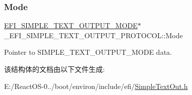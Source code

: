 \subsubsection{\texorpdfstring{Mode}{Mode}}
{\footnotesize\ttfamily \hyperlink{struct_e_f_i___s_i_m_p_l_e___t_e_x_t___o_u_t_p_u_t___m_o_d_e}{E\+F\+I\+\_\+\+S\+I\+M\+P\+L\+E\+\_\+\+T\+E\+X\+T\+\_\+\+O\+U\+T\+P\+U\+T\+\_\+\+M\+O\+DE}$\ast$ \+\_\+\+E\+F\+I\+\_\+\+S\+I\+M\+P\+L\+E\+\_\+\+T\+E\+X\+T\+\_\+\+O\+U\+T\+P\+U\+T\+\_\+\+P\+R\+O\+T\+O\+C\+O\+L\+::\+Mode}

Pointer to S\+I\+M\+P\+L\+E\+\_\+\+T\+E\+X\+T\+\_\+\+O\+U\+T\+P\+U\+T\+\_\+\+M\+O\+DE data. 

该结构体的文档由以下文件生成\+:\begin{DoxyCompactItemize}
\item 
E\+:/\+React\+O\+S-\/0../boot/environ/include/efi/\hyperlink{_simple_text_out_8h}{Simple\+Text\+Out.\+h}\end{DoxyCompactItemize}
